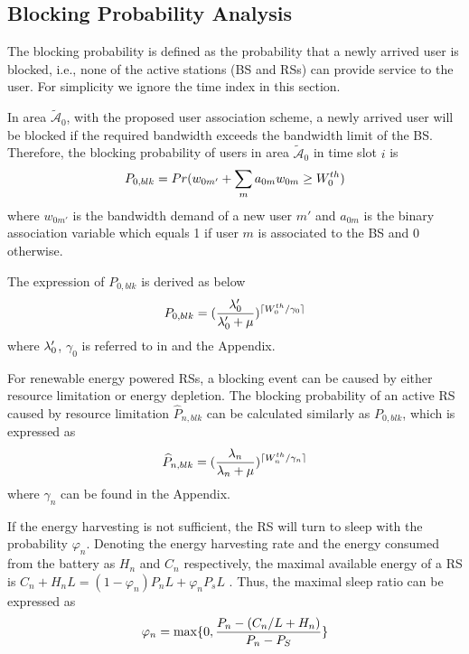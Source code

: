\documentclass[conference]{IEEEtran}
\begin{document}
 \subsection{Blocking Probability Analysis}
 The blocking probability is defined as the probability that a newly arrived user is blocked, i.e., none of the active stations (BS and RSs) can provide service to the user. For simplicity we ignore the time index in this section.

 In area $\widetilde{\mathcal{A}}_0$, with the proposed user association scheme, a newly arrived user will be blocked if the required bandwidth exceeds the bandwidth limit of the BS. Therefore, the blocking probability of users in area $\widetilde{\mathcal{A}}_0$ in time slot $i$ is
 \begin{equation}\label{equ:bolck probability}
 \small{P_{0,blk} = Pr(w_{0m'}+\sum \limits_m a_{0m}w_{0m} \geq W^{th}_0)}
 \end{equation}
 where $w_{0m'}$ is the bandwidth demand of a new user $m'$ and $a_{0m}$ is the binary association variable which equals 1 if user $m$ is associated to the BS and 0 otherwise.

 The expression of $P_{0,blk}$ is derived as below
 \begin{equation}\label{equ:blocking probability of BS}
 \small{P_{0,blk} = (\frac{\lambda'_0}{\lambda'_0+\mu})^{\lceil W^{th}_0/\gamma_0\rceil}}
 \end{equation}
 where $\footnotesize{\lambda'_0}$, $\gamma_0$ is referred to in \cite{Jie2012Adynamic} and the Appendix.


  For renewable energy powered RSs, a blocking event can be caused by either resource limitation or energy depletion. The blocking probability of an active RS caused by resource limitation $\widehat{P}_{n,blk}$ can be calculated similarly as $P_{0,blk}$, which is expressed as
  \begin{equation}\label{equ:resource blocking probability of RS}
  \small{\widehat{P}_{n,blk} = (\frac{\lambda_n}{\lambda_n+\mu})^{\lceil W^{th}_n/\gamma_n\rceil}}
  \end{equation}
  where $\gamma_n$ can be found in the Appendix.

  If the energy harvesting is not sufficient, the RS will turn to sleep with the  probability $\varphi_n$. Denoting the energy harvesting rate and the energy consumed from the battery as $H_n$ and $C_n$ respectively, the maximal available energy of a RS is $C_n+H_nL=(1-\varphi_n)P_nL+\varphi_nP_sL$ \cite{Jie2014Base}. Thus, the maximal sleep ratio can be expressed as
  \begin{equation}\label{equ:sleep ratio}
   \small{\varphi_n = \max\{0,\frac{P_n-(C_n/L+H_n)}{P_n-P_S}\}}
  \end{equation}
\end{document}

